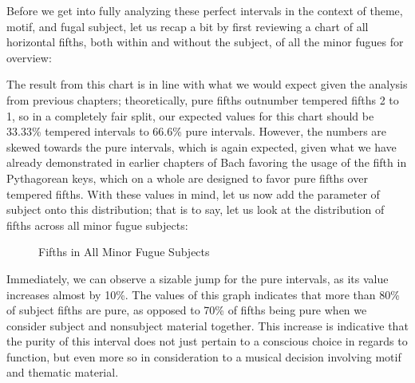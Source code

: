 Before we get into fully analyzing these perfect intervals in the
context of theme, motif, and fugal subject, let us recap a bit by first
reviewing a chart of all horizontal fifths, both within and without the
subject, of all the minor fugues for overview:



    \begin{center}
    \end{center}
    
    The result from this chart is in line with what we would expect given
the analysis from previous chapters; theoretically, pure fifths
outnumber tempered fifths 2 to 1, so in a completely fair split, our
expected values for this chart should be 33.33\% tempered intervals to
66.6\% pure intervals. However, the numbers are skewed towards the pure
intervals, which is again expected, given what we have already
demonstrated in earlier chapters of Bach favoring the usage of the fifth
in Pythagorean keys, which on a whole are designed to favor pure fifths
over tempered fifths. With these values in mind, let us now add the
parameter of subject onto this distribution; that is to say, let us look
at the distribution of fifths across all minor fugue subjects:




\begin{figure}[H]
    \begin{center}
    \caption{Fifths in All Minor Fugue Subjects}
    \end{center}
\end{figure}
    
    Immediately, we can observe a sizable jump for the pure intervals, as
its value increases almost by 10\%. The values of this graph indicates
that more than 80\% of subject fifths are pure, as opposed to 70\% of
fifths being pure when we consider subject and nonsubject material
together. This increase is indicative that the purity of this interval
does not just pertain to a conscious choice in regards to function, but
even more so in consideration to a musical decision involving motif and
thematic material.

